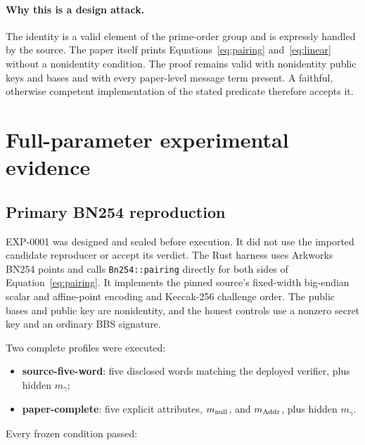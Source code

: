 \documentclass[10pt,a4paper]{article}
\begin{document}
\paragraph{Why this is a design attack.}
The identity is a valid element of the prime-order group and is expressly
handled by the source. The paper itself prints Equations~\eqref{eq:pairing}
and~\eqref{eq:linear} without a nonidentity condition. The proof remains valid
with nonidentity public keys and bases and with every paper-level message term
present. A faithful, otherwise competent implementation of the stated
predicate therefore accepts it.

\section{Full-parameter experimental evidence}

\subsection{Primary BN254 reproduction}

EXP-0001 was designed and sealed before execution. It did not use the
imported candidate reproducer or accept its verdict. The Rust harness uses
Arkworks BN254 points and calls \texttt{Bn254::pairing} directly for both sides
of Equation~\eqref{eq:pairing}. It implements the pinned source's fixed-width
big-endian scalar and affine-point encoding and Keccak-256 challenge order.
The public bases and public key are nonidentity, and the honest controls use a
nonzero secret key and an ordinary BBS signature.

Two complete profiles were executed:
\begin{itemize}
  \item \textbf{source-five-word}: five disclosed words matching the deployed
        verifier, plus hidden $m_\gamma$;
  \item \textbf{paper-complete}: five explicit attributes, $m_{\rm null}$,
        and $m_{\rm Addr}$, plus hidden $m_\gamma$.
\end{itemize}
Every frozen condition passed:
\end{document}

